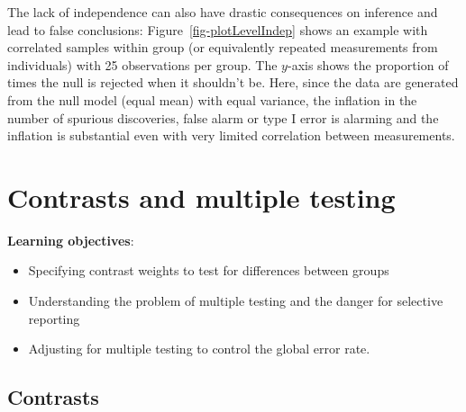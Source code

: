 \documentclass[
  11pt,
  letterpaper,
]{scrbook}
\providecommand{\tightlist}{%
  \setlength{\itemsep}{0pt}\setlength{\parskip}{0pt}}\usepackage{longtable,booktabs,array}
\theoremstyle{definition}
\theoremstyle{remark}
\begin{document}
The lack of independence can also have drastic consequences on inference
and lead to false conclusions: Figure~\ref{fig-plotLevelIndep} shows an
example with correlated samples within group (or equivalently repeated
measurements from individuals) with 25 observations per group. The
\(y\)-axis shows the proportion of times the null is rejected when it
shouldn't be. Here, since the data are generated from the null model
(equal mean) with equal variance, the inflation in the number of
spurious discoveries, false alarm or type I error is alarming and the
inflation is substantial even with very limited correlation between
measurements.


\hypertarget{contrasts-multiple-testing}{%
\chapter{Contrasts and multiple
testing}\label{contrasts-multiple-testing}}

\begin{tcolorbox}[enhanced jigsaw, title=\textcolor{quarto-callout-important-color}{\faExclamation}\hspace{0.5em}{Key concept}, bottomtitle=1mm, opacitybacktitle=0.6, colframe=quarto-callout-important-color-frame, leftrule=.75mm, coltitle=black, colbacktitle=quarto-callout-important-color!10!white, colback=white, toprule=.15mm, rightrule=.15mm, breakable, bottomrule=.15mm, opacityback=0, toptitle=1mm, titlerule=0mm, arc=.35mm, left=2mm]

\textbf{Learning objectives}:

\begin{itemize}
\tightlist
\item
  Specifying contrast weights to test for differences between groups
\item
  Understanding the problem of multiple testing and the danger for
  selective reporting
\item
  Adjusting for multiple testing to control the global error rate.
\end{itemize}

\end{tcolorbox}

\hypertarget{contrasts}{%
\section{Contrasts}\label{contrasts}}
\end{document}
